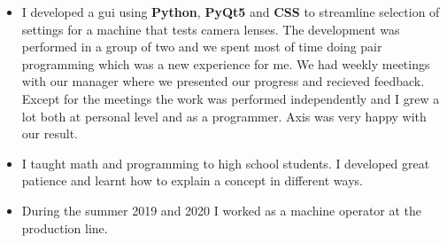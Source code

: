 \documentclass[10pt,a4paper,ragged2e]{altacv}
\begin{document}
\divider

\begin{itemize}
    \item I developed a gui using \textbf{Python}, \textbf{PyQt5} and \textbf{CSS} to streamline selection of settings
    for a machine that tests camera lenses. The development was performed in a group of two and we spent most of time 
    doing pair programming which was a new experience for me. We had weekly meetings with our manager where we presented
    our progress and recieved feedback. Except for the meetings the work was performed independently and I grew 
    a lot both at personal level and as a programmer. Axis was very happy with our result.
\end{itemize}

\divider

    \begin{itemize}
    \item I taught math and programming to high school students. 
    I developed great patience and learnt how to explain a concept in different ways.
\end{itemize}

\divider

\begin{itemize}
    \item During the summer 2019 and 2020 I worked as a machine operator at the production 
    line.
\end{itemize}

\newpage
\end{document}
